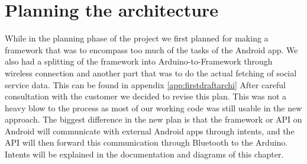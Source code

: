 
\section{Planning the architecture}

While in the planning phase of the project we first planned for making
a framework that was to encompass too much of the tasks of the Android
app. We also had a splitting of the framework into Arduino-to-Framework
through wireless connection and another part that was to do the actual
fetching of social service data. This can be found in appendix \ref{app:firstdraftarchi}
After careful consultation with the customer we decided to revise
this plan. This was not a heavy blow to the process as most of our
working code was still usable in the new approach. The biggest difference
in the new plan is that the framework or API on Android will communicate
with external Android apps through intents, and the API will then
forward this communication through Bluetooth to the Arduino. Intents
will be explained in the documentation and diagrams of this chapter. 
